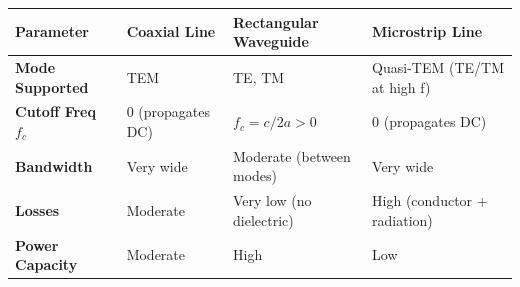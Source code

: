 \documentclass[12pt,a4paper]{article}
\renewcommand{\arraystretch}{1.45}
\begin{document}
\begin{tcolorbox}[tikzbox, title={Comparison of Microwave Transmission Lines}]
\renewcommand{\arraystretch}{1.4}
\par\noindent
{\renewcommand{\arraystretch}{1.65}%
\begin{tabularx}{\linewidth}{|B{3.0cm}|Y|Y|Y|}\hline
\textbf{Parameter} & \textbf{Coaxial Line} & \textbf{Rectangular Waveguide} & \textbf{Microstrip Line} \\[4pt]
\hline
\textbf{Mode Supported} & TEM & TE, TM & Quasi-TEM (TE/TM at high f) \\
\hline
\textbf{Cutoff Freq $f_c$} & $0$ (propagates DC) & $f_c = c/2a > 0$ & $0$ (propagates DC) \\[4pt]
\hline
\textbf{Bandwidth} & Very wide & Moderate (between modes) & Very wide \\
\hline
\textbf{Losses} & Moderate & Very low (no dielectric) & High (conductor + radiation) \\
\hline
\textbf{Power Capacity} & Moderate & High & Low \\
\hline
\end{tabularx}
}
\end{tcolorbox}
\end{document}
